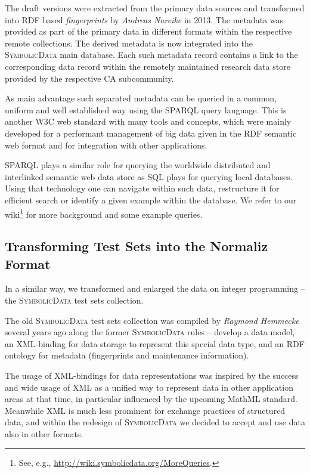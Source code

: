 \documentclass[a4paper,11pt]{article}
\def\SD{\textsc{SymbolicData}}
\begin{document}
The draft versions were extracted from the primary data sources and transformed
into RDF based \emph{fingerprints} by \emph{Andreas Nareike} in 2013.  The
metadata was provided as part of the primary data in different formats within
the respective remote collections. The derived metadata is now integrated into
the {\SD} main database. Each such metadata record contains a link to the
corresponding data record within the remotely maintained research data store
provided by the respective CA subcommunity.

As main advantage such separated metadata can be queried in a common, uniform
and well established way using the SPARQL query language. This is another W3C
web standard with many tools and concepts, which were mainly developed for a
performant management of big data given in the RDF semantic web format and for
integration with other applications.

SPARQL plays a similar role for querying the worldwide distributed and
interlinked semantic web data store as SQL plays for querying local databases.
Using that technology one can navigate within such data, restructure it for
efficient search or identify a given example within the database.  We refer to
our wiki\footnote{See, e.g., \url{http://wiki.symbolicdata.org/MoreQueries}.}
for more background and some example queries.

\subsection{Transforming Test Sets into the Normaliz Format}

In a similar way, we transformed and enlarged the data on integer programming --
the {\SD} test sets collection. 

The old {\SD} test sets collection was compiled by \emph{Raymond Hemmecke}
several years ago along the former {\SD} rules -- develop a data model, an
XML-binding for data storage to represent this special data type, and an RDF
ontology for metadata (fingerprints and maintenance information).

The usage of XML-bindings for data representations was inspired by the success
and wide usage of XML as a unified way to represent data in other application
areas at that time, in particular influenced by the upcoming MathML standard.
Meanwhile XML is much less prominent for exchange practices of structured data,
and within the redesign of {\SD} we decided to accept and use data also in
other formats. 
\end{document}
